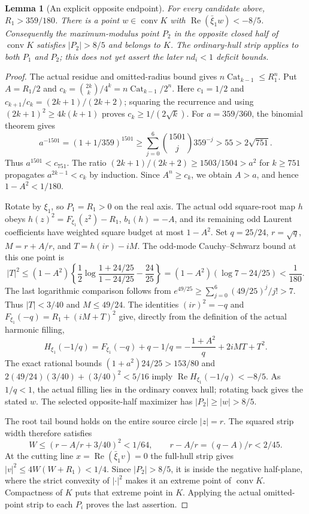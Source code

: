 \documentclass[11pt]{article}
\newtheorem{lemma}[theorem]{Lemma}
\newcommand{\Cat}{\operatorname{Cat}}
\begin{document}
	\begin{lemma}[An explicit opposite endpoint]\label{lem:imaginary-opposite}
		For every candidate above, $R_1>359/180$.  There is a point
		$w\in\operatorname{conv}K$ with
		$\operatorname{Re}(\bar\xi_1w)<-8/5$.  Consequently the maximum-modulus
		point $P_2$ in the opposite closed half of $\operatorname{conv}K$
		satisfies $|P_2|>8/5$ and belongs to $K$.  The ordinary-hull strip
		applies to both $P_1$ and $P_2$; this does not yet assert the later
		$nd_i<1$ deficit bounds.
	\end{lemma}
	\begin{proof}
		The actual residue and omitted-radius bound gives
		$n\Cat_{k-1}\leq R_1^n$.  Put $A=R_1/2$ and
		$c_k=\binom{2k}{k}/4^k=n\Cat_{k-1}/2^n$.
		Here $c_1=1/2$ and
		$c_{k+1}/c_k=(2k+1)/(2k+2)$; squaring the recurrence and using
		$(2k+1)^2\geq4k(k+1)$ proves $c_k\geq1/(2\sqrt{k})$.
		For $a=359/360$, the binomial theorem gives
		\[
		a^{-1501}=(1+1/359)^{1501}
		\geq\sum_{j=0}^{6}\binom{1501}{j}359^{-j}
		>55>2\sqrt{751}.
		\]
		Thus $a^{1501}<c_{751}$.  The ratio
		$(2k+1)/(2k+2)\geq1503/1504>a^2$ for $k\geq751$ propagates
		$a^{2k-1}<c_k$ by induction.  Since $A^n\geq c_k$, we obtain
		$A>a$, and hence $1-A^2<1/180$.
		
		Rotate by $\xi_1$, so $P_1=R_1>0$ on the real axis.  The actual odd
		square-root map $h$ obeys
		$h(z)^2=F_{\xi_1}(z^2)-R_1$,
		$b_1(h)=-A$, and its remaining odd Laurent coefficients have
		weighted square budget at most $1-A^2$.  Set
		$q=25/24$, $r=\sqrt q$, $M=r+A/r$, and
		$T=h(ir)-iM$.  The odd-mode Cauchy--Schwarz bound at this one point is
		\[
		|T|^2\leq(1-A^2)
		\left\{\frac12\log\frac{1+24/25}{1-24/25}-\frac{24}{25}\right\}
		=(1-A^2)(\log7-24/25)<\frac1{180}.
		\]
		The last logarithmic comparison follows from
		$e^{49/25}\geq\sum_{j=0}^{6}(49/25)^j/j!>7$.
		Thus $|T|<3/40$ and $M\leq49/24$.  The identities
		$(ir)^2=-q$ and $F_{\xi_1}(-q)=R_1+(iM+T)^2$ give, directly from
		the definition of the actual harmonic filling,
		\begin{equation}\label{eq:imaginary-root-witness}
			H_{\xi_1}(-1/q)=F_{\xi_1}(-q)+q-1/q
			=-\frac{1+A^2}{q}+2iMT+T^2.
		\end{equation}
		The exact rational bounds
		$(1+a^2)24/25>153/80$ and
		$2(49/24)(3/40)+(3/40)^2<5/16$ imply
		$\operatorname{Re}H_{\xi_1}(-1/q)<-8/5$.
		As $1/q<1$, the actual filling lies in the ordinary convex hull;
		rotating back gives the stated $w$.  The selected opposite-half
		maximizer has $|P_2|\geq|w|>8/5$.
		
		The root tail bound holds on the entire source circle $|z|=r$.
		The squared strip width therefore satisfies
		\[
		W\leq(r-A/r+3/40)^2<1/64,
		\qquad r-A/r=(q-A)/r<2/45.
		\]
		At the cutting line $x=\operatorname{Re}(\bar\xi_1v)=0$ the full-hull
		strip gives $|v|^2\leq4W(W+R_1)<1/4$.  Since $|P_2|>8/5$, it is
		inside the negative half-plane, where the strict convexity of
		$|\cdot|^2$ makes it an extreme point of $\operatorname{conv}K$.
		Compactness of $K$ puts that extreme point in $K$.  Applying the
		actual omitted-point strip to each $P_i$ proves the last assertion.
	\end{proof}
	
\end{document}
